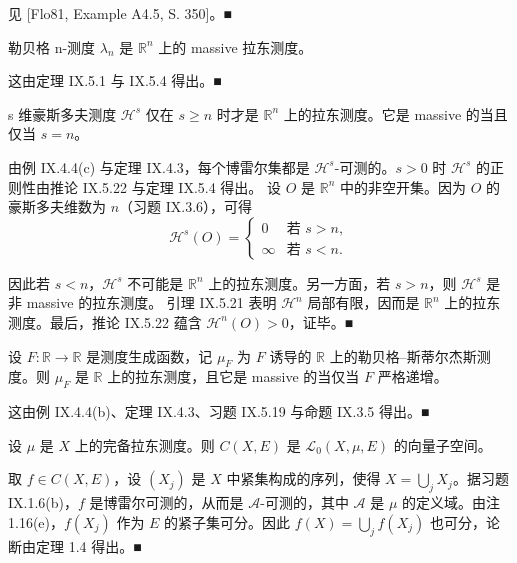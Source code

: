 \begin{remark}
\begin{items}
\proofhead
见 [Flo81, Example A4.5, S. 350]。\nobreak\hspace{0.35em}■
\item

勒贝格 n-测度 $ \lambda_n $ 是 $ \mathbb{R}^n $ 上的 massive 拉东测度。

\proofhead
这由定理 IX.5.1 与 IX.5.4 得出。\nobreak\hspace{0.35em}■
\item

s 维豪斯多夫测度 $ \mathcal{H}^s $ 仅在 $ s \ge n $ 时才是 $ \mathbb{R}^n $ 上的拉东测度。它是 massive 的当且仅当 $ s = n $。

\proofhead
由例 IX.4.4(c) 与定理 IX.4.3，每个博雷尔集都是 $ \mathcal{H}^s $-可测的。$ s > 0 $ 时 $ \mathcal{H}^s $ 的正则性由推论 IX.5.22 与定理 IX.5.4 得出。
设 $ O $ 是 $ \mathbb{R}^n $ 中的非空开集。因为 $ O $ 的豪斯多夫维数为 $ n $（习题 IX.3.6），可得
\begin{equation*}
\mathcal{H}^s(O) = \begin{cases} 0 & \text{若 } s > n , \\ \infty & \text{若 } s < n . \end{cases}
\end{equation*}

因此若 $ s < n $，$ \mathcal{H}^s $ 不可能是 $ \mathbb{R}^n $ 上的拉东测度。另一方面，若 $ s > n $，则 $ \mathcal{H}^s $ 是非 massive 的拉东测度。
引理 IX.5.21 表明 $ \mathcal{H}^n $ 局部有限，因而是 $ \mathbb{R}^n $ 上的拉东测度。最后，推论 IX.5.22 蕴含 $ \mathcal{H}^n(O) > 0 $，证毕。\nobreak\hspace{0.35em}■

\item

设 $ F: \mathbb{R} \to \mathbb{R} $ 是测度生成函数，记 $ \mu_F $ 为 $ F $ 诱导的 $ \mathbb{R} $ 上的勒贝格–斯蒂尔杰斯测度。则 $ \mu_F $ 是 $ \mathbb{R} $ 上的拉东测度，且它是 massive 的当仅当 $ F $ 严格递增。

\proofhead
这由例 IX.4.4(b)、定理 IX.4.3、习题 IX.5.19 与命题 IX.3.5 得出。\nobreak\hspace{0.35em}■
\end{items}

\end{remark}

\begin{theorem}

设 $ \mu $ 是 $ X $ 上的完备拉东测度。则 $ C(X,E) $ 是 $ \mathcal{L}_0(X,\mu,E) $ 的向量子空间。

\proofhead
取 $ f \in C(X,E) $，设 $ (X_j) $ 是 $ X $ 中紧集构成的序列，使得 $ X = \bigcup_j X_j $。据习题 IX.1.6(b)，$ f $ 是博雷尔可测的，从而是 $ \mathcal{A} $-可测的，其中 $ \mathcal{A} $ 是 $ \mu $ 的定义域。由注 1.16(e)，$ f(X_j) $ 作为 $ E $ 的紧子集可分。因此 $ f(X) = \bigcup_j f(X_j) $ 也可分，论断由定理 1.4 得出。\nobreak\hspace{0.35em}■
\end{theorem}

